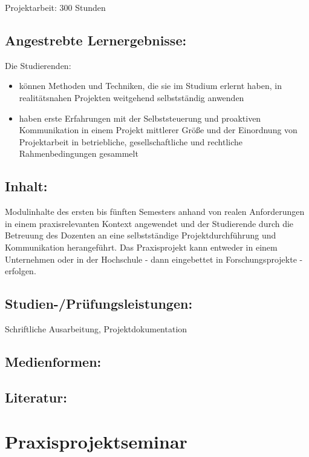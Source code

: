 Projektarbeit: 300 Stunden

\section{Angestrebte
Lernergebnisse:}\label{angestrebte-lernergebnisse-18}

Die Studierenden:

\begin{itemize}
\item
  können Methoden und Techniken, die sie im Studium erlernt haben, in
  realitätsnahen Projekten weitgehend selbstständig anwenden
\item
  haben erste Erfahrungen mit der Selbststeuerung und proaktiven
  Kommunikation in einem Projekt mittlerer Größe und der Einordnung von
  Projektarbeit in betriebliche, gesellschaftliche und rechtliche
  Rahmenbedingungen gesammelt
\end{itemize}

\section{Inhalt:}\label{inhalt-18}

Modulinhalte des ersten bis fünften Semesters anhand von realen
Anforderungen in einem praxisrelevanten Kontext angewendet und der
Studierende durch die Betreuung des Dozenten an eine selbstständige
Projektdurchführung und Kommunikation herangeführt. Das Praxisprojekt
kann entweder in einem Unternehmen oder in der Hochschule - dann
eingebettet in Forschungsprojekte - erfolgen.

\section{Studien-/Prüfungsleistungen:}\label{studien-pruxfcfungsleistungen-18}

Schriftliche Ausarbeitung, Projektdokumentation

\section{Medienformen:}\label{medienformen-18}

\section{Literatur:}\label{literatur-18}

\chapter{Praxisprojektseminar}\label{praxisprojektseminar}

